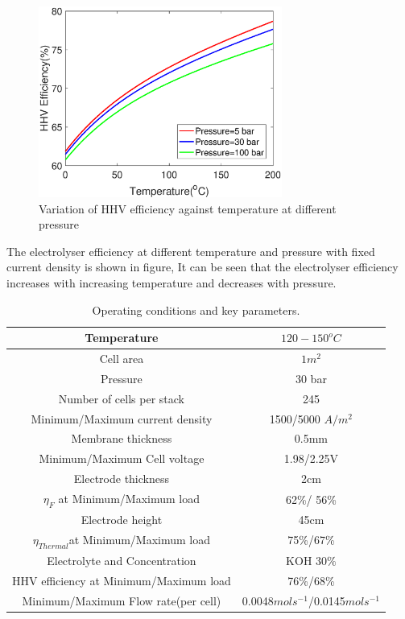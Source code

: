 \begin{figure}[H]
\centering
\includegraphics[width=8cm]{HHV.eps}
\caption{Variation of HHV efficiency against temperature at different pressure}
\end{figure} 
The electrolyser efficiency at different temperature and pressure with fixed current density is shown in figure, It can be seen that the electrolyser efficiency increases with increasing temperature and decreases with pressure.

\begin{table}
\centering
\begin{tabular}{ |c|c| } 
 \hline
 Temperature & $120 - 150 ^oC$  \\ 
 \hline
 Cell area & $1m^2$\\
 \hline
 Pressure & 30 bar \\
 \hline
 Number of cells per stack & 245\\ 
 \hline
 Minimum/Maximum current density & 1500/5000 $A/m^2$\\ 
 \hline
 Membrane thickness & 0.5mm\\ 
 \hline
 Minimum/Maximum Cell voltage & 1.98/2.25V \\ 
 \hline
 Electrode thickness & 2cm\\
 \hline
 $\eta_F$ at Minimum/Maximum load & 62\%/ 56\% \\ 
 \hline
 Electrode height & 45cm\\
 \hline
 $\eta_{Thermal}$at Minimum/Maximum load & 75\%/67\% \\ 
 \hline
 Electrolyte and Concentration & KOH $30\%$\\
 \hline
 HHV efficiency at Minimum/Maximum load &  76\%/68\% \\ 
 \hline
 Minimum/Maximum Flow rate(per cell) & 0.0048$mols^{-1}$/0.0145$mols^{-1}$\\
 \hline
\end{tabular}
\caption{\label{tab:table-name}Operating conditions and key parameters.}
\end{table}




